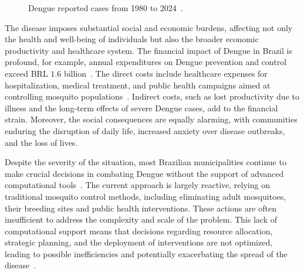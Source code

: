 \begin{figure}[!ht]
\caption{Dengue reported cases from 1980 to 2024~\citep{paho-1}.}
\label{picture:dengue_reported_cases_graphic}
\end{figure}

The disease imposes substantial social and economic burdens, affecting not only the health and well-being of individuals but also the broader economic productivity and healthcare system. The financial impact of Dengue in Brazil is profound, for example, annual expenditures on Dengue prevention and control exceed BRL $1.6$ billion~\citep{negreiros-2020}. The direct costs include healthcare expenses for hospitalization, medical treatment, and public health campaigns aimed at controlling mosquito populations~\citep{negreiros:2008}. Indirect costs, such as lost productivity due to illness and the long-term effects of severe Dengue cases, add to the financial strain. Moreover, the social consequences are equally alarming, with communities enduring the disruption of daily life, increased anxiety over disease outbreaks, and the loss of lives. 

Despite the severity of the situation, most Brazilian municipalities continue to make crucial decisions in combating Dengue without the support of advanced computational tools~\citep{brasil-dept-helth:2009}. The current approach is largely reactive, relying on traditional mosquito control methods, including eliminating adult mosquitoes, their breeding sites and public health interventions. These actions are often insufficient to address the complexity and scale of the problem. This lack of computational support means that decisions regarding resource allocation, strategic planning, and the deployment of interventions are not optimized, leading to possible inefficiencies and potentially exacerbating the spread of the disease~\citep{forbes-2002,xie-2015,rais-2011}.

